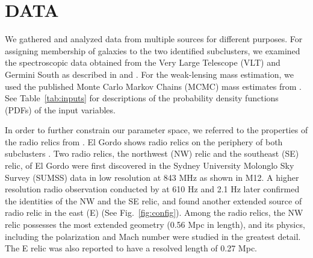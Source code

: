 \section{DATA} 
We gathered and analyzed data from multiple sources for different
purposes. For assigning membership of galaxies to the two identified subclusters, we
examined the spectroscopic data obtained from the Very Large Telescope (VLT) and
Germini South as described in  and \citet{Sifon13}.
For the weak-lensing mass estimation, we used the published
Monte Carlo Markov Chains (MCMC) mass estimates from .
See Table~\ref{tab:inputs} for descriptions of the probability density
functions (PDFs) of the input
variables. \par 
In order to further constrain our parameter space, we referred to the properties of
the radio relics from \citet{L13}. El Gordo shows radio relics on the
periphery of both subclusters . Two radio relics, the
northwest (NW) relic and the southeast (SE) relic, of El Gordo were first
discovered in the Sydney University Molonglo Sky Survey (SUMSS) data in low
resolution at 843 MHz \citep{Mauch03} as shown in M12. A higher
resolution radio observation conducted by \cite{L13} at 610 \mega Hz and
2.1 \giga Hz later confirmed the identities of the NW and the SE relic, and
found another extended source of radio relic in the east (E) (See Fig.~\ref{fig:config}). Among the radio relics, the NW relic possesses the most extended geometry
(0.56 Mpc in length), and its physics, including the
polarization and Mach number were studied in the greatest detail. The E relic
was also reported to have a resolved length of 0.27 Mpc. 

